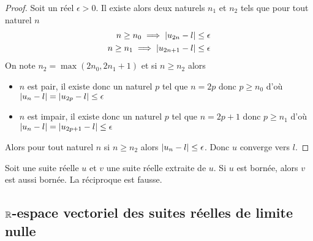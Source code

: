 \begin{proof}
  Soit un réel $\epsilon>0$. Il existe alors deux naturels $n_1$ et $n_2$ tels que pour tout naturel $n$
  \begin{align}
    n \geq n_0 \implies \left\lvert u_{2n}-l\right\rvert \leq \epsilon \\  n \geq n_1 \implies \left\lvert u_{2n+1}-l\right\rvert \leq \epsilon
  \end{align}
  On note $n_2=\max(2n_0,2n_1+1)$ et si $n \geq n_2$ alors
  \begin{itemize}
  \item $n$ est pair, il existe donc un naturel $p$ tel que $n=2p$ donc $p\geq n_0$ d'où $\left\lvert u_n-l\right\rvert=\left\lvert u_{2p}-l\right\rvert \leq \epsilon$
  \item $n$ est impair, il existe donc un naturel $p$ tel que $n=2p+1$ donc $p\geq n_1$ d'où $\left\lvert u_n-l\right\rvert=\left\lvert u_{2p+1}-l\right\rvert \leq \epsilon$
  \end{itemize}
  Alors pour tout naturel $n$ si $n \geq n_2$ alors $\left\lvert u_n-l\right\rvert \leq \epsilon$. Donc $u$ converge vers $l$.
\end{proof}
\begin{prop}
  Soit une suite réelle $u$ et $v$ une suite réelle extraite de $u$. Si $u$ est bornée, alors $v$ est aussi bornée. La réciproque est fausse.
\end{prop}

\subsection{$\mathbb{R}$-espace vectoriel des suites réelles de limite nulle}

